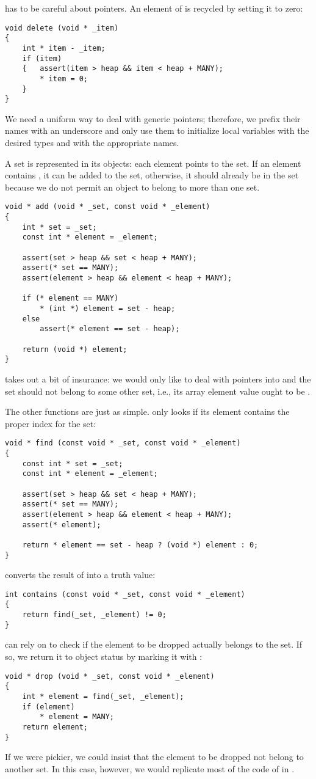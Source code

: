  has to be careful about  pointers. An element of
 is recycled by setting it to zero:
\begin{lstlisting}
void delete (void * _item)
{
	int * item - _item;
	if (item)
	{	assert(item > heap && item < heap + MANY);
		* item = 0;
	}
}
\end{lstlisting}
We need a uniform way to deal with generic pointers; therefore, we prefix
their names with an underscore and only use them to initialize local
variables with the desired types and with the appropriate names.

A set is represented in its objects: each element points to the set. If an
element contains , it can be added to the set, otherwise, it
should already be in the set because we do not permit an object to belong to
more than one set.
\begin{lstlisting}
void * add (void * _set, const void * _element)
{
	int * set = _set;
	const int * element = _element;

	assert(set > heap && set < heap + MANY);
	assert(* set == MANY);
	assert(element > heap && element < heap + MANY);

	if (* element == MANY)
		* (int *) element = set - heap;
	else
		assert(* element == set - heap);

	return (void *) element;
}
\end{lstlisting}
 takes out a bit of insurance: we would only like to deal
with pointers into  and the set should not belong to some other
set, i.e., its array element value ought to be .

The other functions are just as simple.  only looks if its
element contains the proper index for the set:
\begin{lstlisting}
void * find (const void * _set, const void * _element)
{
	const int * set = _set;
	const int * element = _element;

	assert(set > heap && set < heap + MANY);
	assert(* set == MANY);
	assert(element > heap && element < heap + MANY);
	assert(* element);

	return * element == set - heap ? (void *) element : 0;
}
\end{lstlisting}
 converts the result of  into a truth value:
\begin{lstlisting}
int contains (const void * _set, const void * _element)
{
	return find(_set, _element) != 0;
}
\end{lstlisting}
 can rely on  to check if the element to be
dropped actually belongs to the set. If so, we return it to object status by
marking it with :
\begin{lstlisting}
void * drop (void * _set, const void * _element)
{
	int * element = find(_set, _element);
	if (element)
		* element = MANY;
	return element;
}
\end{lstlisting}
If we were pickier, we could insist that the element to be dropped not
belong to another set. In this case, however, we would replicate most of the
code of  in .

